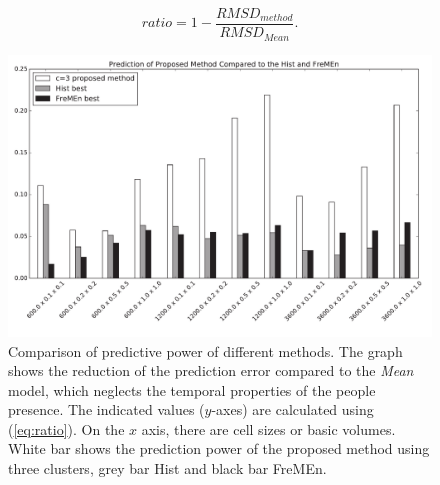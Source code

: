 \begin{equation}\label{eq:ratio}
ratio = 1 - \frac{RMSD_{method}}{RMSD_{Mean}}.
\end{equation}

\begin{figure}
\begin{center}
    \includegraphics[width=1.0\columnwidth]{fig/ours3_hist_fremen.pdf}
    \caption{Comparison of predictive power of different methods. 
The graph shows the reduction of the prediction error compared to the \textit{Mean} model, which neglects the temporal properties of the people presence.
The indicated values ($y$-axes) are calculated using (\ref{eq:ratio}). 
On the $x$ axis, there are cell sizes or basic volumes.
White bar shows the prediction power of the proposed method using three clusters, grey bar Hist and black bar FreMEn.\label{graph:pedestrians}}
\end{center}
\end{figure}

